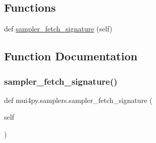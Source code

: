 \subsection*{Functions}
\begin{DoxyCompactItemize}
\item 
def \hyperlink{namespacemui4py_1_1samplers_a9a8cab6e85c136bee6b6d5beb96d0faa}{sampler\+\_\+fetch\+\_\+signature} (self)
\end{DoxyCompactItemize}


\subsection{Function Documentation}
\mbox{\label{namespacemui4py_1_1samplers_a9a8cab6e85c136bee6b6d5beb96d0faa}} 
\subsubsection{\texorpdfstring{sampler\+\_\+fetch\+\_\+signature()}{sampler\_fetch\_signature()}}
{\footnotesize\ttfamily def mui4py.\+samplers.\+sampler\+\_\+fetch\+\_\+signature (\begin{DoxyParamCaption}\item[{}]{self }\end{DoxyParamCaption})}

